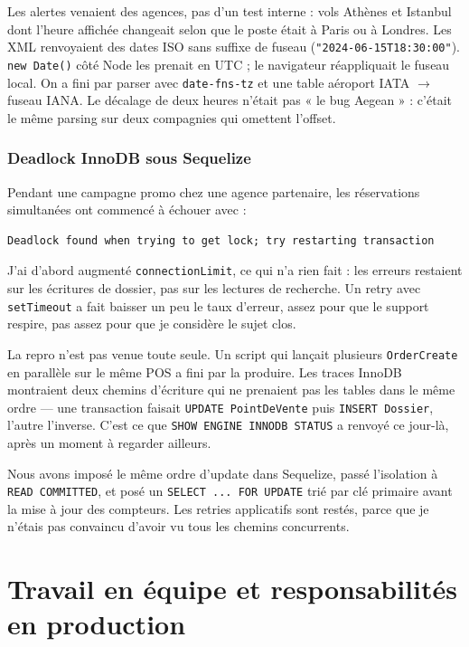 Les alertes venaient des agences, pas d'un test interne : vols Athènes et Istanbul dont l'heure affichée changeait selon que le poste était à Paris ou à Londres. Les XML renvoyaient des dates ISO sans suffixe de fuseau (\texttt{"2024-06-15T18:30:00"}). \texttt{new Date()} côté Node les prenait en UTC ; le navigateur réappliquait le fuseau local. On a fini par parser avec \texttt{date-fns-tz} et une table aéroport IATA $\rightarrow$ fuseau IANA. Le décalage de deux heures n'était pas « le bug Aegean » : c'était le même parsing sur deux compagnies qui omettent l'offset.

\subsection{Deadlock InnoDB sous Sequelize}

Pendant une campagne promo chez une agence partenaire, les réservations simultanées ont commencé à échouer avec :
\begin{verbatim}
Deadlock found when trying to get lock; try restarting transaction
\end{verbatim}

J'ai d'abord augmenté \texttt{connectionLimit}, ce qui n'a rien fait : les erreurs restaient sur les écritures de dossier, pas sur les lectures de recherche. Un retry avec \texttt{setTimeout} a fait baisser un peu le taux d'erreur, assez pour que le support respire, pas assez pour que je considère le sujet clos.

La repro n'est pas venue toute seule. Un script qui lançait plusieurs \texttt{OrderCreate} en parallèle sur le même POS a fini par la produire. Les traces InnoDB montraient deux chemins d'écriture qui ne prenaient pas les tables dans le même ordre --- une transaction faisait \texttt{UPDATE PointDeVente} puis \texttt{INSERT Dossier}, l'autre l'inverse. C'est ce que \texttt{SHOW ENGINE INNODB STATUS} a renvoyé ce jour-là, après un moment à regarder ailleurs.

Nous avons imposé le même ordre d'update dans Sequelize, passé l'isolation à \texttt{READ COMMITTED}, et posé un \texttt{SELECT ... FOR UPDATE} trié par clé primaire avant la mise à jour des compteurs. Les retries applicatifs sont restés, parce que je n'étais pas convaincu d'avoir vu tous les chemins concurrents.

\chapter{Travail en équipe et responsabilités en production}
\label{chap:posture_professionnelle}


